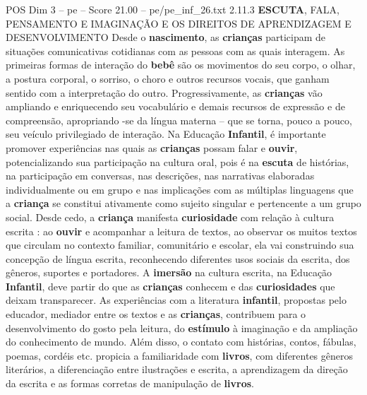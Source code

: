 \begin{textsample}{POS Dim 3 – pe – Score 21.00 – pe/pe\_inf\_26.txt}  \label{ex:f3_pos_272}
2.11.3 \textbf{ESCUTA}, FALA, PENSAMENTO E IMAGINAÇÃO E OS DIREITOS DE APRENDIZAGEM E DESENVOLVIMENTO Desde o \textbf{nascimento}, as \textbf{crianças} participam de situações comunicativas cotidianas com as pessoas com as quais interagem.
As primeiras formas de interação do \textbf{bebê} são os movimentos do seu corpo, o olhar, a postura corporal, o sorriso, o choro e outros recursos vocais, que ganham sentido com a interpretação do outro.
Progressivamente, as \textbf{crianças} vão ampliando e enriquecendo seu vocabulário e demais recursos de expressão e de compreensão, apropriando -se da língua materna – que se torna, pouco a pouco, seu veículo privilegiado de interação.
Na Educação \textbf{Infantil}, é importante promover experiências nas quais as \textbf{crianças} possam falar e \textbf{ouvir}, potencializando sua participação na cultura oral, pois é na \textbf{escuta} de histórias, na participação em conversas, nas descrições, nas narrativas elaboradas individualmente ou em grupo e nas implicações com as múltiplas linguagens que a \textbf{criança} se constitui ativamente como sujeito singular e pertencente a um grupo social.
Desde cedo, a \textbf{criança} manifesta \textbf{curiosidade} com relação à cultura escrita : ao \textbf{ouvir} e acompanhar a leitura de textos, ao observar os muitos textos que circulam no contexto familiar, comunitário e escolar, ela vai construindo sua concepção de língua escrita, reconhecendo diferentes usos sociais da escrita, dos gêneros, suportes e portadores.
A \textbf{imersão} na cultura escrita, na Educação \textbf{Infantil}, deve partir do que as \textbf{crianças} conhecem e das \textbf{curiosidades} que deixam transparecer.
As experiências com a literatura \textbf{infantil}, propostas pelo educador, mediador entre os textos e as \textbf{crianças}, contribuem para o desenvolvimento do gosto pela leitura, do \textbf{estímulo} à imaginação e da ampliação do conhecimento de mundo.
Além disso, o contato com histórias, contos, fábulas, poemas, cordéis etc. propicia a familiaridade com \textbf{livros}, com diferentes gêneros literários, a diferenciação entre ilustrações e escrita, a aprendizagem da direção da escrita e as formas corretas de manipulação de \textbf{livros}.

\end{textsample}
